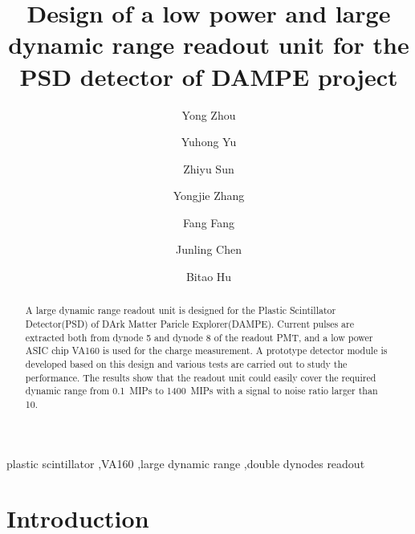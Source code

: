 \documentclass[5p, times]{elsarticle}
\begin{document}
\begin{frontmatter}

\title{Design of a low power and large dynamic range readout unit for the PSD detector of DAMPE project}

\author[imp,lzu,ucas]{Yong Zhou}

\author[imp]{Yuhong Yu}

\author[imp]{Zhiyu Sun}
\author[imp]{Yongjie Zhang}
\author[imp]{Fang Fang}
\author[imp]{Junling Chen}

\author[lzu]{Bitao Hu}

\address[imp]{Institute of Modern Physics, Chinese Academy of Sciences,  509 Nanchang Road,  Lanzhou,  730000,  P.R.China}
\address[ucas]{Graduate University of the Chinese Academy of Sciences,  19A Yuquan Road,  Beijing,  100049,  P.R.China}
\address[lzu]{School of Nuclear Science and Technology,  Lanzhou University,  222 South Tianshui Road,  Lanzhou,  730000,  P.R.China}
\begin{abstract}
	
A large dynamic range readout unit is designed for the Plastic Scintillator Detector(PSD) of DArk Matter Paricle Explorer(DAMPE).
Current pulses are extracted both from dynode 5 and dynode 8 of the readout PMT, and a low power ASIC chip VA160 is used for the charge measurement.
A prototype detector module is developed based on this design and various tests are carried out to study the performance.
The results show that the readout unit could easily cover the required dynamic range from \SI{0.1}{MIPs} to \SI{1400}{MIPs} with a signal to noise ratio larger than 10.

\end{abstract}

\begin{keyword}
plastic scintillator
\sep VA160
\sep large dynamic range
\sep double dynodes readout


\end{keyword}

\end{frontmatter}

\linenumbers
\section{Introduction}
\label{sec:introduction}
\end{document}
